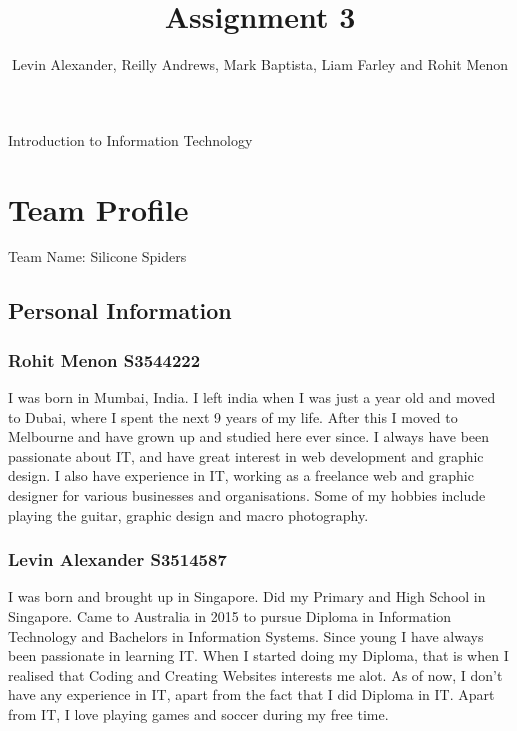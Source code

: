\documentclass[10pt,a4paper]{article}
\title{\Huge Assignment 3}
\begin{document}
	\begin{titlepage}
		\maketitle
		\begin{center}
			\large Introduction to Information Technology\\
			\vspace{12cm}
			\author{Levin Alexander, Reilly Andrews, Mark Baptista, Liam Farley and Rohit Menon}
		\end{center}
	\end{titlepage}
\tableofcontents
\pagebreak
\section{Team Profile}
\Large Team Name: Silicone Spiders
\normalsize
\subsection{Personal Information}
\subsubsection{Rohit Menon \textbar\hspace{0.4mm}  S3544222 }
I was born in Mumbai, India. I left india when I was just a year old and moved to Dubai, where I spent the next 9 years of my life. After this I moved to Melbourne and have grown up and studied here ever since. I always have been passionate about IT, and have great interest in web development and graphic design. I also have experience in IT, working as a freelance web and graphic designer for various businesses and organisations. Some of my hobbies include playing the guitar, graphic design and macro photography.
\subsubsection{Levin Alexander \textbar\hspace{0.4mm}S3514587}

I was born and brought up in Singapore. Did my Primary and High School in Singapore. Came to Australia in 2015 to pursue Diploma in Information Technology and Bachelors in Information Systems. Since young I have always been passionate in learning IT. When I started doing my Diploma, that is when I realised that Coding and Creating Websites interests me alot. As of now, I don’t have any experience in IT, apart from the fact that I did Diploma in IT. Apart from IT, I love playing games and soccer during my free time.
\end{document}
